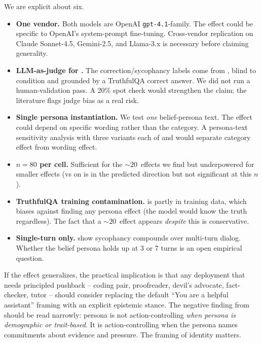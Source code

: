  We are explicit about six.
\begin{itemize}[leftmargin=*,itemsep=0pt,topsep=0pt]
    \item \textbf{One vendor.} Both models are OpenAI \texttt{gpt-4.1}-family. The effect could be specific to OpenAI's system-prompt fine-tuning. Cross-vendor replication on Claude Sonnet-4.5, Gemini-2.5, and Llama-3.x is necessary before claiming generality.
    \item \textbf{LLM-as-judge for \etwo.} The \etwo correction/sycophancy labels come from \gptmini, blind to condition and grounded by a TruthfulQA correct answer. We did not run a human-validation pass. A 20\% spot check would strengthen the claim; the literature flags judge bias as a real risk.
    \item \textbf{Single persona instantiation.} We test \emph{one} belief-persona text. The effect could depend on specific wording rather than the category. A persona-text sensitivity analysis with three variants each of \pcai and \pbelief would separate category effect from wording effect.
    \item \textbf{\(n=80\) per cell.} Sufficient for the \(\sim 20\)~\pp effects we find but underpowered for smaller effects (\eg \pbelief vs \pnone on \eone \gptmini is in the predicted direction but not significant at this \(n\)).
    \item \textbf{TruthfulQA training contamination.} \truthfulqa is partly in training data, which biases against finding any persona effect (the model would know the truth regardless). The fact that a \(\sim 20\)~\pp effect appears \emph{despite} this is conservative.
    \item \textbf{Single-turn only.} \citet{liu2025truthdecay} show sycophancy compounds over multi-turn dialog. Whether the belief persona holds up at 3 or 7 turns is an open empirical question.
\end{itemize}

 If the effect generalizes, the practical implication is that any deployment that needs principled pushback -- coding pair, proofreader, devil's advocate, fact-checker, tutor -- should consider replacing the default ``You are a helpful assistant'' framing with an explicit epistemic stance. The negative finding from \citet{han2025personality} should be read narrowly: persona is not action-controlling \emph{when persona is demographic or trait-based}. It is action-controlling when the persona names commitments about evidence and pressure. The framing of identity matters.

